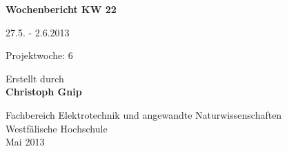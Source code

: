 
\begin{center}
{\Huge \textbf{Wochenbericht KW 22}\par}
\vspace{1cm}
{\Huge 27.5. - 2.6.2013\par}
\vspace{1cm}
{\Huge Projektwoche: 6\par}

\vspace{2cm}

\large{Erstellt durch}\\
\Large{\textbf{Christoph Gnip}}


\vfill

{\normalsize Fachbereich Elektrotechnik und angewandte Naturwissenschaften\\
Westfälische Hochschule\\[2ex]Mai 2013}

\end{center}
\newpage